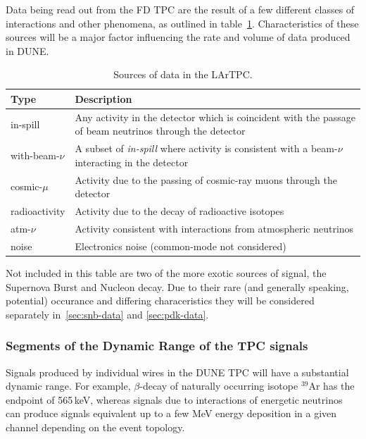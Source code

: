 Data being read out from the FD TPC are the result of a few different classes of interactions and other phenomena,
as outlined in table~\ref{tab:dune-data-sources}. Characteristics of these sources will
be a major factor influencing the rate and volume of data produced in DUNE.
\begin{table}[ht!]
	\centering
	\begin{tabular}{| p{1in} | p{4.5in} |}
		\hline
	\textbf{Type} & \textbf{Description} \\ \hline
		
	in-spill & Any activity in the detector which is coincident with
	the passage of beam neutrinos through the detector \\ \hline
	
	with-beam-$\nu$ & A subset of \textit{in-spill} where activity is
	consistent with a beam-$\nu$ interacting in the detector \\ \hline
	
	cosmic-$\mu$ & Activity due to the passing of cosmic-ray muons
	through the detector \\ \hline
	
	radioactivity & Activity due to the decay of radioactive
	isotopes \\ \hline
	
	atm-$\nu$ & Activity consistent with interactions from
	atmospheric neutrinos \\ \hline
	
	noise & Electronics noise (common-mode not considered) \\ \hline

	\end{tabular}
	\caption{Sources of data in the LArTPC.}
	\label{tab:dune-data-sources}
\end{table}

Not included in this table are two of the more exotic sources of signal, the Supernova Burst and Nucleon decay.
Due to their rare (and generally speaking, potential) occurance and differing characeristics they will be considered separately
in~\ref{sec:snb-data} and \ref{sec:pdk-data}.

\subsubsection{Segments of the Dynamic Range of the TPC signals}

Signals produced by individual wires in the DUNE TPC will have a substantial
dynamic range. For example, $\beta$-decay of naturally occurring isotope $^{39}$Ar has the endpoint of
565\,keV, whereas signals due to interactions of energetic neutrinos can produce signals
equivalent up to a few MeV energy deposition in a given channel depending on the event topology.

